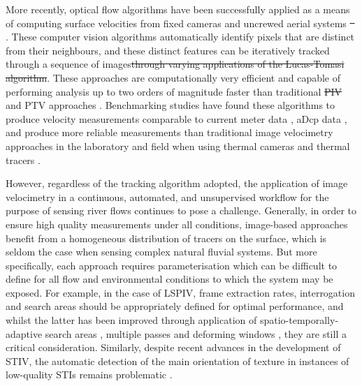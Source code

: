 \documentclass[hess, manuscript]{copernicus} %
\providecommand{\DIFadd}[1]{{\protect\color{blue}\uwave{#1}}} %
\providecommand{\DIFdel}[1]{{\protect\color{red}\sout{#1}}} %
\providecommand{\DIFaddbegin}{} %
\providecommand{\DIFaddend}{} %
\providecommand{\DIFdelbegin}{} %
\providecommand{\DIFdelend}{} %
\newcommand{\DIFscaledelfig}{0.5}
\newlength{\DIFdelgraphicswidth} %
\newlength{\DIFdelgraphicsheight} %
\newcommand{\DIFaddincludegraphics}[2][]{{\color{blue}\fbox{\DIFOincludegraphics[#1]{#2}}}} %
\newcommand{\DIFdelincludegraphics}[2][]{%
\sbox{\DIFdelgraphicsbox}{\DIFOincludegraphics[#1]{#2}}%
\settoboxwidth{\DIFdelgraphicswidth}{\DIFdelgraphicsbox} %
\settoboxtotalheight{\DIFdelgraphicsheight}{\DIFdelgraphicsbox} %
\scalebox{\DIFscaledelfig}{%
\parbox[b]{\DIFdelgraphicswidth}{\usebox{\DIFdelgraphicsbox}\\[-\baselineskip] \rule{\DIFdelgraphicswidth}{0em}}\llap{\resizebox{\DIFdelgraphicswidth}{\DIFdelgraphicsheight}{%
\setlength{\unitlength}{\DIFdelgraphicswidth}%
\begin{picture}(1,1)%
\thicklines\linethickness{2pt} %
{\color[rgb]{1,0,0}\put(0,0){\framebox(1,1){}}}%
{\color[rgb]{1,0,0}\put(0,0){\line( 1,1){1}}}%
{\color[rgb]{1,0,0}\put(0,1){\line(1,-1){1}}}%
\end{picture}%
}\hspace*{3pt}}} %
} %
\DeclareRobustCommand{\DIFaddbegin}{\DIFOaddbegin \let\includegraphics\DIFaddincludegraphics} %
\DeclareRobustCommand{\DIFaddend}{\DIFOaddend \let\includegraphics\DIFOincludegraphics} %
\DeclareRobustCommand{\DIFdelbegin}{\DIFOdelbegin \let\includegraphics\DIFdelincludegraphics} %
\DeclareRobustCommand{\DIFdelend}{\DIFOaddend \let\includegraphics\DIFOincludegraphics} %
\begin{document}
More recently, optical flow algorithms have been successfully applied as a means of computing surface velocities from fixed cameras \citep{Tauro2018b, Lin2019, Khalid2019} and uncrewed aerial systems \DIFdelbegin \DIFdel{\mbox{%
\citep{Perks2016}}\hskip0pt%
}\DIFdelend \DIFaddbegin \DIFadd{\mbox{%
\citep{Perks2016, eltner2020}}\hskip0pt%
}\DIFaddend . These computer vision algorithms \DIFaddbegin \DIFadd{e.g. Kande-Lucas-Tomasi algorithm \mbox{%
\citep{Lucas1981, Tomasi1991, Shi1994}}\hskip0pt%
, }\DIFaddend automatically identify pixels that are distinct from their neighbours, and these distinct features can be iteratively tracked through a sequence of images\DIFdelbegin \DIFdel{through varying applications of the Lucas-Tomasi algorithm}\DIFdelend . These approaches are computationally very efficient and capable of performing analysis up to two orders of magnitude faster than traditional \DIFdelbegin \DIFdel{PIV }\DIFdelend \DIFaddbegin \DIFadd{LSPIV }\DIFaddend and PTV approaches \citep{Tauro2018b}. Benchmarking studies have found these algorithms to produce velocity measurements comparable to current meter data \citep{Tauro2018b}, aDcp data \citep{Pearce2020}, and produce more reliable measurements than traditional image velocimetry approaches in the laboratory and field when using thermal cameras and thermal tracers \citep{Lin2019}. 

However, regardless of the tracking algorithm adopted, the application of image velocimetry in a continuous, automated, and unsupervised workflow for the purpose of sensing river flows continues to pose a challenge. Generally, in order to ensure high quality measurements under all conditions, image-based approaches benefit from a homogeneous distribution of tracers on the surface, which is seldom the case when sensing complex natural fluvial systems. But more specifically, each approach requires parameterisation which can be difficult to define for all flow and environmental conditions to which the system may be exposed. For example, in the case of LSPIV, frame extraction rates, interrogation and search areas should be appropriately defined for optimal performance, and whilst the latter has been improved through application of spatio-temporally-adaptive search areas \citep{Fleit2019}, multiple passes and deforming windows \citep[e.g.,][]{Thielicke2021}, they are still a critical consideration. Similarly, despite recent advances in the development of STIV, the automatic detection of the main orientation of texture in instances of low-quality STIs remains problematic \citep{Wang2024}.
\end{document}
